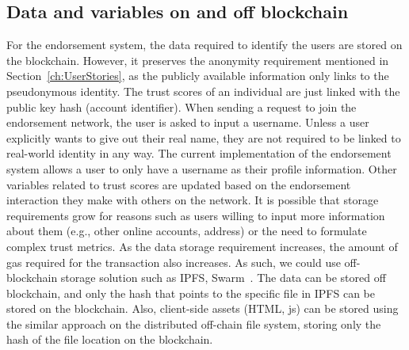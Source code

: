 \subsection{Data and variables on and off blockchain} \label{subsec:datablockchain}
For the endorsement system, the data required to identify the users are stored
on the blockchain. However, it preserves the anonymity requirement mentioned in
Section~\ref{ch:UserStories}, as the publicly available information only links
to the pseudonymous identity. The trust scores of an individual are just linked
with the public key hash (account identifier). When sending a request to join
the endorsement network, the user is asked to input a username. Unless a user
explicitly wants to give out their real name, they are not required to be
linked to real-world identity in any way. The current implementation of the
endorsement system allows a user to only have a username as their profile
information. Other variables related to trust scores are updated based on the
endorsement interaction they make with others on the network. It is possible
that storage requirements grow for reasons such as users willing to input more
information about them (e.g., other online accounts, address) or the need to
formulate complex trust metrics. As the data storage requirement increases, the
amount of gas required for the transaction also increases. As such, we could
use off-blockchain storage solution such as IPFS, Swarm~\cite{benet2014ipfs}.
The data can be stored off blockchain, and only the hash that points to the
specific file in IPFS can be stored on the blockchain. Also, client-side assets
(HTML, js) can be stored using the similar approach on the distributed
off-chain file system, storing only the hash of the file location on the
blockchain. 


